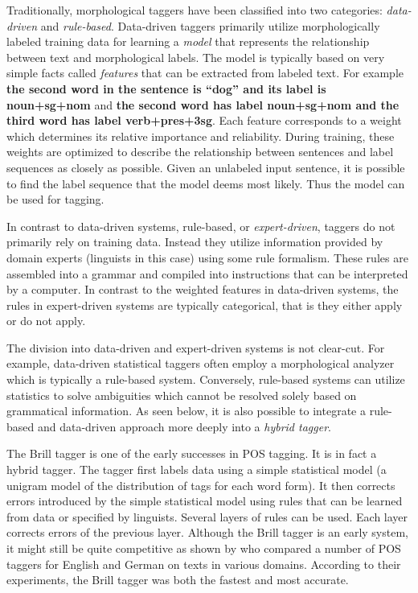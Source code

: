 Traditionally, morphological taggers have been classified into two
categories: {\it data-driven} and {\it rule-based}. Data-driven
taggers primarily utilize morphologically labeled training data for
learning a {\it model} that represents the relationship between text
and morphological labels. The model is typically based on very simple
facts called {\it features} that can be extracted from labeled
text. For example {\bf the second word in the sentence is ``dog'' and
  its label is noun+sg+nom} and {\bf the second word has label
  noun+sg+nom and the third word has label verb+pres+3sg}. Each
feature corresponds to a weight which determines its relative
importance and reliability. During training, these weights are
optimized to describe the relationship between sentences and label
sequences as closely as possible. Given an unlabeled input sentence,
it is possible to find the label sequence that the model deems most
likely. Thus the model can be used for tagging.

In contrast to data-driven systems, rule-based, or {\it
  expert-driven}, taggers do not primarily rely on training
data. Instead they utilize information provided by domain experts
(linguists in this case) using some rule formalism. These rules are
assembled into a grammar and compiled into instructions that can be
interpreted by a computer. In contrast to the weighted features in
data-driven systems, the rules in expert-driven systems are typically
categorical, that is they either apply or do not apply. 

The division into data-driven and expert-driven systems is not
clear-cut. For example, data-driven statistical taggers often employ a
morphological analyzer which is typically a rule-based
system. Conversely, rule-based systems can utilize statistics to solve
ambiguities which cannot be resolved solely based on grammatical
information. As seen below, it is also possible to integrate a
rule-based and data-driven approach more deeply into a {\it hybrid
  tagger}.

The Brill tagger \citep{Brill1992} is one of the early successes in
POS tagging. It is in fact a hybrid tagger. The tagger first labels
data using a simple statistical model (a unigram model of the
distribution of tags for each word form). It then corrects errors
introduced by the simple statistical model using rules that can be learned
from data or specified by linguists. Several layers of rules can be
used. Each layer corrects errors of the previous layer. Although the
Brill tagger is an early system, it might still be quite
competitive as shown by \cite{Horsmann2015} who compared a number of
POS taggers for English and German on texts in various
domains. According to their experiments, the Brill tagger was both the
fastest and most accurate.

